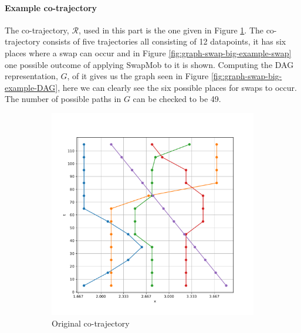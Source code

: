 \documentclass[12pt]{article}
\newcommand{\cotraj}{\mathcal{R}}
\newcommand{\DAG}{G}
\theoremstyle{definition}
\begin{document}
\paragraph{Example co-trajectory}
The co-trajectory, \(\cotraj\), used in this part is the one given in
Figure \ref{fig:graph-swap-big-example-orig}. The co-trajectory
consists of five trajectories all consisting of 12 datapoints, it
has six places where a swap can occur and in Figure
\ref{fig:graph-swap-big-example-swap} one possible outcome of applying
SwapMob to it is shown. Computing the DAG representation, \(\DAG\), of
it gives us the graph seen in Figure
\ref{fig:graph-swap-big-example-DAG}, here we can clearly see the six
possible places for swaps to occur. The number of possible paths in
\(\DAG\) can be checked to be 49.

\begin{figure}
  \centering
  \begin{subfigure}[t]{0.49\textwidth}
    \includegraphics[width=\textwidth]{graph-swap-big-example-orig.pdf}
    \caption{Original co-trajectory}
    \label{fig:graph-swap-big-example-orig}
  \end{subfigure}
  \begin{subfigure}[t]{0.49\textwidth}

\end{subfigure}
\end{figure}
\end{document}
